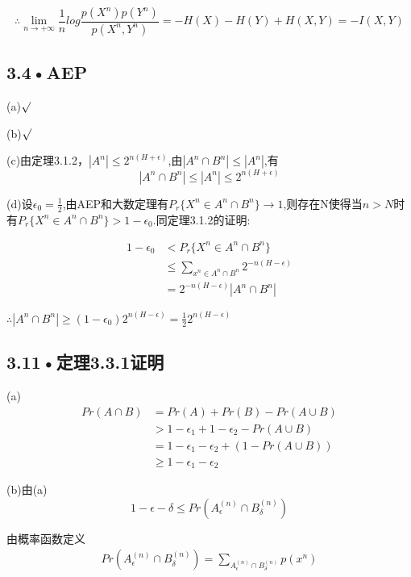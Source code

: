 \documentclass[UTF8]{ctexart}
\begin{document}
$$\therefore\lim\limits_{n\to+\infty}\frac{1}{n}log\frac{p(X^n)p(Y^n)}{p(X^n,Y^n)}=-H(X)-H(Y)+H(X,Y)=-I(X,Y)$$

\subsection*{3.4•AEP}

(a)$\surd$

(b)$\surd$

(c)由定理3.1.2，$|A^n|\leqslant 2^{n(H+\epsilon)}$,由$|A^n\cap B^n|\leqslant |A^n|$,有$$|A^n\cap B^n|\leqslant |A^n|\leqslant 2^{n(H+\epsilon)}$$

(d)设$\epsilon _0=\frac{1}{2}$,由AEP和大数定理有$P_r\{X^n\in A^n\cap B^n\}\to 1$,则存在N使得当$n>N$时有$P_r\{X^n\in A^n\cap B^n\}> 1-\epsilon _0$.同定理3.1.2的证明:

\begin{equation*}
\begin{split}
1-\epsilon _0&<P_r\{X^n\in A^n\cap B^n\}\\
&\leqslant \sum _{x^n\in A^n\cap B^n}2^{-n(H-\epsilon )}\\
&= 2^{-n(H-\epsilon )}|A^n\cap B^n|
\end{split}
\end{equation*}

$\therefore |A^n\cap B^n|\geqslant (1-\epsilon _0)2^{n(H-\epsilon )}=\frac{1}{2}2^{n(H-\epsilon )}$
\subsection*{3.11•定理3.3.1证明}

(a)
\begin{equation*}
\begin{split}
Pr(A\cap B)&=Pr(A)+Pr(B)-Pr(A\cup B)\\
&>1-\epsilon _1+1-\epsilon _2 -Pr(A\cup B)\\
&=1-\epsilon _1-\epsilon_2+(1-Pr(A\cup B))\\
&\geqslant 1-\epsilon _1-\epsilon_2
\end{split}
\end{equation*}

(b)由(a)$$1-\epsilon -\delta\leqslant Pr(A_\epsilon^{(n)}\cap B_\delta^{(n)})$$

由概率函数定义
\begin{equation*}
\begin{split}
Pr(A_\epsilon^{(n)}\cap B_\delta^{(n)})=\sum _{A_\epsilon^{(n)}\cap B_\delta^{(n)}}p(x^n)
\end{split}
\end{equation*}
\end{document}
